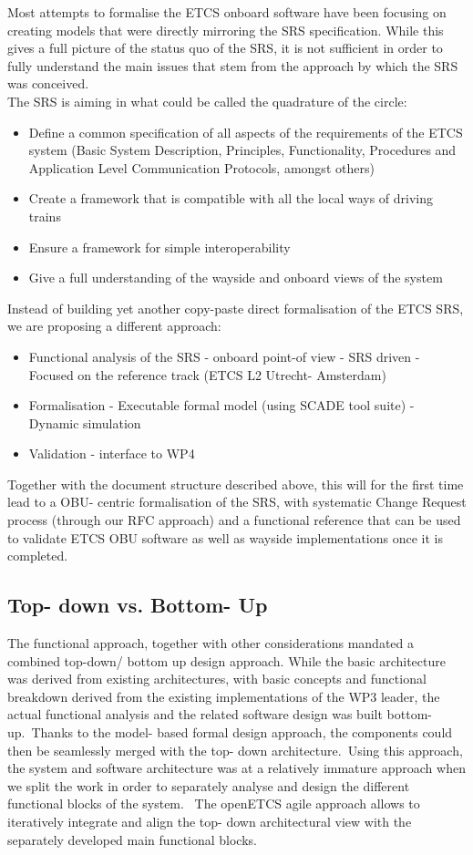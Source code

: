 Most attempts to formalise the ETCS onboard software have been focusing on creating models that were directly mirroring the SRS specification.
While this gives a full picture of the status quo of the SRS, it is not sufficient in order to fully understand the main issues that stem from the approach by which the SRS was conceived. \\
%
The SRS is aiming in what could be called the quadrature of the circle:
\begin{itemize}
\item Define a common specification of all aspects of the requirements of the ETCS system (Basic System Description, Principles, Functionality, Procedures and Application Level Communication Protocols, amongst others)
\item Create a framework that is compatible with all the local ways of driving trains
\item Ensure a framework for simple interoperability 
\item Give a full understanding of the wayside and onboard views of the system
\end {itemize}

Instead of building yet another copy-paste direct formalisation of the ETCS SRS, we are proposing a different approach:
%
\begin{itemize}
\item Functional analysis of the SRS
- onboard point-of view
- SRS driven
- Focused on the reference track (ETCS L2 Utrecht- Amsterdam)
\item Formalisation
- Executable formal model (using SCADE tool suite)
- Dynamic simulation 
\item Validation
- interface to WP4
\end{itemize}

Together with the document structure described above, this will for the first time lead to a OBU- centric formalisation of the SRS, with systematic Change Request process (through our RFC approach) and a functional reference that can be used to validate ETCS OBU software as well as wayside implementations once it is completed.\\

\subsection{Top- down vs. Bottom- Up}
%
%
The functional approach, together with other considerations mandated a combined top-down/ bottom up design approach.
While the basic architecture was derived from existing architectures, with basic concepts and functional breakdown derived from the existing implementations of the WP3 leader, the actual functional analysis and the related software design was built bottom- up.\
Thanks to the model- based formal design approach, the components could then be seamlessly merged with the top- down architecture.\
Using this approach, the system and software architecture was at a relatively immature approach when we split the work in order to separately analyse and design the different functional blocks of the system. \
The openETCS agile approach allows to iteratively integrate and align the top- down architectural view with the separately developed main functional blocks.\


